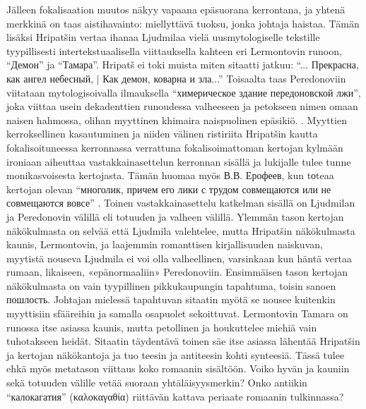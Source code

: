 \documentclass[12pt,a4paper]{article}
\begin{document}
Jälleen fokalisaation muutos näkyy vapaana epäsuorana kerrontana, ja yhtenä merkkinä on taas aistihavainto: miellyttävä tuoksu, jonka johtaja haistaa. %
Tämän lisäksi Hripatšin vertaa ihanaa Ljudmilaa vielä uusmytologiselle tekstille tyypillisesti intertekstuaalisella viittauksella kahteen eri Lermontovin runoon, \enquote{Демон} ja \enquote{Тамара}. Hripatš ei toki muista miten sitaatti jatkuu: \enquote{... Прекрасна, как ангел небесный, | Как демон, коварна и зла...} Toisaalta taas Peredonoviin viitataan mytologisoivalla ilmauksella \enquote{химерическое здание передоновской лжи}, joka viittaa usein dekadenttien runoudessa valheeseen ja petokseen nimen omaan naisen hahmossa, olihan myyttinen khimaira naispuolinen epäsikiö. \parencite[200]{hansen-love1999}. Myyttien kerroksellinen kasautuminen ja niiden välinen ristiriita Hripatšin kautta fokalisoituneessa kerronnassa verrattuna fokalisoimattoman kertojan kylmään ironiaan aiheuttaa vastakkainasettelun kerronnan sisällä ja lukijalle tulee tunne monikasvoisesta kertojasta. Tämän huomaa myös В.В. Ерофеев, kun tоteaa kertojan olevan \enquote{многолик, причем его лики с трудом совмещаются или не совмещаются вовсе} \parencite[157]{jerofeev1985}. Toinen vastakkainasettelu katkelman sisällä on Ljudmilan ja Peredonovin välillä eli totuuden ja valheen välillä. Ylemmän tason kertojan näkökulmasta on selvää että Ljudmila valehtelee, mutta Hripatšin näkökulmasta kaunis, Lermontovin, ja laajemmin romanttisen kirjallisuuden naiskuvan, myytistä nouseva Ljudmila ei voi olla valheellinen, varsinkaan kun häntä vertaa rumaan, likaiseen, «epänormaaliin» Peredonoviin. Ensimmäisen tason kertojan näkökulmasta on vain tyypillinen pikkukaupungin tapahtuma, toisin sanoen пошлость. Johtajan mielessä tapahtuvan sitaatin myötä se nousee kuitenkin myyttisiin sfääreihin ja samalla osapuolet sekoittuvat. Lermontovin Tamara on runossa itse asiassa kaunis, mutta petollinen ja houkuttelee miehiä vain tuhotakseen heidät. Sitaatin täydentävä toinen säe itse asiassa lähentää Hripatšin ja kertojan näkökantoja ja tuo teesin ja antiteesin kohti synteesiä. Tässä tulee ehkä myös metatason viittaus koko romaanin sisältöön. Voiko hyvän ja kauniin sekä totuuden välille vetää suoraan yhtäläisyysmerkin? Onko antiikin \enquote{калокагатия} (\foreignlanguage{greek}{καλοκαγαθία}) riittävän kattava periaate romaanin tulkinnassa?
% 
\end{document}
